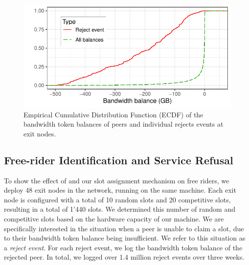 
\begin{figure}[t]
	\centering
	\includegraphics[width=.8\linewidth]{trustchain/assets/exit_node_rejects}
	\caption{Empirical Cumulative Distribution Function (ECDF) of the bandwidth token balances of peers and individual rejects events at exit nodes.}
	\label{fig:exit_node_rejects}
\end{figure}

\subsection{Free-rider Identification and Service Refusal}
To show the effect of \TrustChain{} and our slot assignment mechanism on free riders, we deploy 48 exit nodes in the \Tribler{} network, running on the same machine.
Each exit node is configured with a total of 10 random slots and 20 competitive slots, resulting in a total of 1'440 slots.
We determined this number of random and competitive slots based on the hardware capacity of our machine.
We are specifically interested in the situation when a peer is unable to claim a slot, due to their bandwidth token balance being insufficient.
We refer to this situation as a \emph{reject event}.
For each reject event, we log the bandwidth token balance of the rejected peer.
In total, we logged over 1.4 million reject events over three weeks.

